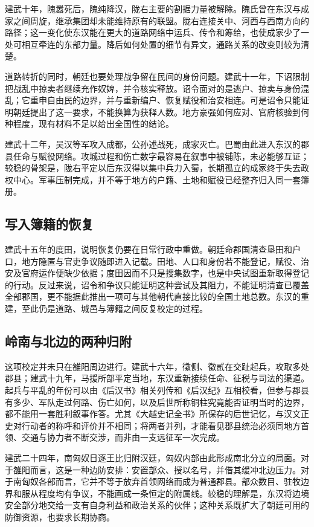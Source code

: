 建武十年，隗嚣死后，隗纯降汉，陇右主要的割据力量被解除。隗氏曾在东汉与成家之间周旋，继承集团却未能维持原有的联盟。陇右连接关中、河西与西南方向的路径；这一变化使东汉能在更大的道路网络中运兵、传令和筹给，也使成家少了一处可相互牵连的东部力量。降后如何处置的细节有异文，通路关系的改变则较为清楚。

道路转折的同时，朝廷也要处理战争留在民间的身份问题。建武十一年，下诏限制把战乱中掠卖者继续充作奴婢，并令核实释放。诏令面对的是逃户、掠卖与身份混乱；它重申自由民的边界，并与重新编户、恢复赋役和治安相连。可是诏令只能证明朝廷提出了这一要求，不能换算为获释人数。地方豪强如何应对、官府核验到何种程度，现有材料不足以给出全国性的结论。

建武十二年，吴汉等军攻入成都，公孙述战死，成家灭亡。巴蜀由此进入东汉的郡县任命与赋役网络。攻城过程和伤亡数字最容易在叙事中被铺陈，未必能够互证；较稳的骨架是，陇右平定以后东汉得以集中兵力入蜀，长期孤立的成家终于失去政权中心。军事压制完成，并不等于地方的户籍、土地和赋役已经整齐归入同一套簿册。

\subsection{写入簿籍的恢复}

建武十五年的度田，说明恢复仍要在日常行政中重做。朝廷命郡国清查垦田和户口，地方隐匿与官吏争议随即进入记载。田地、人口和身份若不能登记，赋役、治安及官府运作便缺少依据；度田因而不只是搜集数字，也是中央试图重新取得登记的行动。反过来说，诏令和争议只能证明这种尝试及其阻力，不能证明清查已覆盖全部郡国，更不能据此推出一项可与其他朝代直接比较的全国土地总数。东汉的重建，至此仍是道路、城邑与簿籍之间反复校定的过程。

\subsection{岭南与北边的两种归附}

这项校定并未只在雒阳周边进行。建武十六年，徵侧、徵贰在交趾起兵，攻取多处郡县；建武十九年，马援所部平定当地，东汉重新接续任命、征税与司法的渠道。起兵与平乱的年份可以由《后汉书》相关列传和《后汉纪》互相校看，但参与郡县有多少、军队走过何路、伤亡如何，以及后世所称铜柱究竟能否证明当时的边界，都不能用一套胜利叙事作答。尤其《大越史记全书》所保存的后世记忆，与汉文正史对行动者的称呼和评价并不相同；将两者并列，才能看见郡县统治必须同地方首领、交通与协力者不断交涉，而非由一支远征军一次完成。

建武二十四年，南匈奴日逐王比归附汉廷，匈奴内部由此形成南北分立的局面。对于雒阳而言，这是一种边防安排：安置部众、授以名号，并借其缓冲北边压力。对于南匈奴各部而言，它并不等于放弃首领网络而成为普通郡县。部众数目、驻牧边界和服从程度均有争议，不能画成一条恒定的附属线。较稳的理解是，东汉将边境安全部分地交给一支有自身利益和政治关系的伙伴；这种关系既扩大了朝廷可用的防御资源，也要求长期协商。

